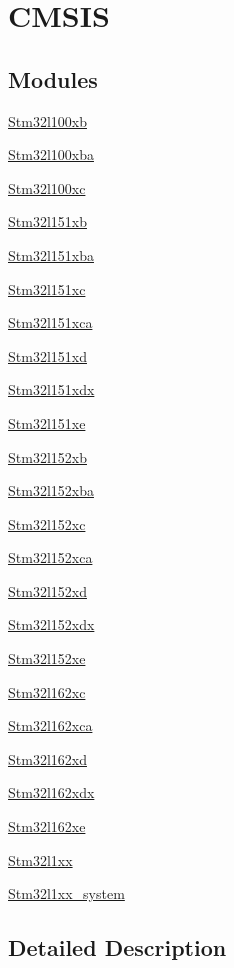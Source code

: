 \hypertarget{group___c_m_s_i_s}{\section{C\-M\-S\-I\-S}
\label{group___c_m_s_i_s}
}
\subsection*{Modules}
\begin{DoxyCompactItemize}
\item 
\hyperlink{group__stm32l100xb}{Stm32l100xb}
\item 
\hyperlink{group__stm32l100xba}{Stm32l100xba}
\item 
\hyperlink{group__stm32l100xc}{Stm32l100xc}
\item 
\hyperlink{group__stm32l151xb}{Stm32l151xb}
\item 
\hyperlink{group__stm32l151xba}{Stm32l151xba}
\item 
\hyperlink{group__stm32l151xc}{Stm32l151xc}
\item 
\hyperlink{group__stm32l151xca}{Stm32l151xca}
\item 
\hyperlink{group__stm32l151xd}{Stm32l151xd}
\item 
\hyperlink{group__stm32l151xdx}{Stm32l151xdx}
\item 
\hyperlink{group__stm32l151xe}{Stm32l151xe}
\item 
\hyperlink{group__stm32l152xb}{Stm32l152xb}
\item 
\hyperlink{group__stm32l152xba}{Stm32l152xba}
\item 
\hyperlink{group__stm32l152xc}{Stm32l152xc}
\item 
\hyperlink{group__stm32l152xca}{Stm32l152xca}
\item 
\hyperlink{group__stm32l152xd}{Stm32l152xd}
\item 
\hyperlink{group__stm32l152xdx}{Stm32l152xdx}
\item 
\hyperlink{group__stm32l152xe}{Stm32l152xe}
\item 
\hyperlink{group__stm32l162xc}{Stm32l162xc}
\item 
\hyperlink{group__stm32l162xca}{Stm32l162xca}
\item 
\hyperlink{group__stm32l162xd}{Stm32l162xd}
\item 
\hyperlink{group__stm32l162xdx}{Stm32l162xdx}
\item 
\hyperlink{group__stm32l162xe}{Stm32l162xe}
\item 
\hyperlink{group__stm32l1xx}{Stm32l1xx}
\item 
\hyperlink{group__stm32l1xx__system}{Stm32l1xx\-\_\-system}
\end{DoxyCompactItemize}


\subsection{Detailed Description}
